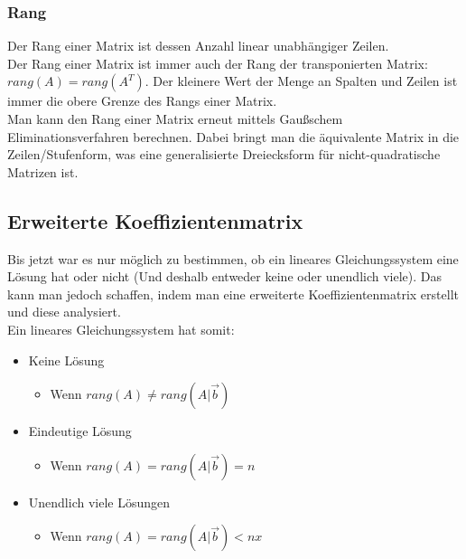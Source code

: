 \documentclass{article}
\begin{document}
	\subsubsection{Rang}
	Der Rang einer Matrix ist dessen Anzahl linear unabhängiger Zeilen. \\
	Der Rang einer Matrix ist immer auch der Rang der transponierten Matrix: $rang(A)=rang(A^T)$. Der kleinere Wert der Menge an Spalten und Zeilen ist immer die obere Grenze des Rangs einer Matrix. \\
	Man kann den Rang einer Matrix erneut mittels Gaußschem Eliminationsverfahren berechnen. Dabei bringt man die äquivalente Matrix in die Zeilen/Stufenform, was eine generalisierte Dreiecksform für nicht-quadratische Matrizen ist.
	\subsection{Erweiterte Koeffizientenmatrix}
	Bis jetzt war es nur möglich zu bestimmen, ob ein lineares Gleichungssystem eine Lösung hat oder nicht (Und deshalb entweder keine oder unendlich viele). Das kann man jedoch schaffen, indem man eine erweiterte Koeffizientenmatrix erstellt und diese analysiert. \\
	Ein lineares Gleichungssystem hat somit:
	\begin{itemize}
		\item{Keine Lösung}
		\begin{itemize}
			\item{Wenn $rang(A)\ne rang(A|\vec{b})$}
		\end{itemize}
		\item{Eindeutige Lösung}
		\begin{itemize}
			\item{Wenn $rang(A)=rang(A|\vec{b})=n$}
		\end{itemize}
		\item{Unendlich viele Lösungen}
		\begin{itemize}
			\item{Wenn $rang(A)=rang(A|\vec{b})<nx$}
		\end{itemize}
	\end{itemize}
\end{document}
